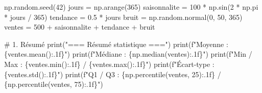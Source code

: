 \documentclass[
  french,
  11pt,
  a4paper,
]{scrbook}
\newenvironment{Shaded}{}{}
\newcommand{\BuiltInTok}[1]{\textcolor[rgb]{0.84,0.23,0.29}{#1}}
\newcommand{\CommentTok}[1]{\textcolor[rgb]{0.42,0.45,0.49}{#1}}
\newcommand{\DecValTok}[1]{\textcolor[rgb]{0.00,0.36,0.77}{#1}}
\newcommand{\FloatTok}[1]{\textcolor[rgb]{0.00,0.36,0.77}{#1}}
\newcommand{\NormalTok}[1]{\textcolor[rgb]{0.14,0.16,0.18}{#1}}
\newcommand{\OperatorTok}[1]{\textcolor[rgb]{0.14,0.16,0.18}{#1}}
\newcommand{\SpecialCharTok}[1]{\textcolor[rgb]{0.00,0.36,0.77}{#1}}
\newcommand{\SpecialStringTok}[1]{\textcolor[rgb]{0.01,0.18,0.38}{#1}}
\newcommand{\StringTok}[1]{\textcolor[rgb]{0.01,0.18,0.38}{#1}}
\begin{document}
\begin{tcolorbox}[enhanced jigsaw, arc=.35mm, bottomrule=.15mm, bottomtitle=1mm, breakable, colback=white, colbacktitle=quarto-callout-tip-color!10!white, colframe=quarto-callout-tip-color-frame, coltitle=black, left=2mm, leftrule=.75mm, opacityback=0, opacitybacktitle=0.6, rightrule=.15mm, title=\textcolor{quarto-callout-tip-color}{\faLightbulb}\hspace{0.5em}{✅ Voir la correction}, titlerule=0mm, toprule=.15mm, toptitle=1mm]

\begin{Shaded}
\begin{Highlighting}[]
\NormalTok{np.random.seed(}\DecValTok{42}\NormalTok{)}
\NormalTok{jours }\OperatorTok{=}\NormalTok{ np.arange(}\DecValTok{365}\NormalTok{)}
\NormalTok{saisonnalite }\OperatorTok{=} \DecValTok{100} \OperatorTok{*}\NormalTok{ np.sin(}\DecValTok{2} \OperatorTok{*}\NormalTok{ np.pi }\OperatorTok{*}\NormalTok{ jours }\OperatorTok{/} \DecValTok{365}\NormalTok{)}
\NormalTok{tendance }\OperatorTok{=} \FloatTok{0.5} \OperatorTok{*}\NormalTok{ jours}
\NormalTok{bruit }\OperatorTok{=}\NormalTok{ np.random.normal(}\DecValTok{0}\NormalTok{, }\DecValTok{50}\NormalTok{, }\DecValTok{365}\NormalTok{)}
\NormalTok{ventes }\OperatorTok{=} \DecValTok{500} \OperatorTok{+}\NormalTok{ saisonnalite }\OperatorTok{+}\NormalTok{ tendance }\OperatorTok{+}\NormalTok{ bruit}

\CommentTok{\# 1. Résumé}
\BuiltInTok{print}\NormalTok{(}\StringTok{"=== Résumé statistique ==="}\NormalTok{)}
\BuiltInTok{print}\NormalTok{(}\SpecialStringTok{f"Moyenne    : }\SpecialCharTok{\{}\NormalTok{ventes}\SpecialCharTok{.}\NormalTok{mean()}\SpecialCharTok{:.1f\}}\SpecialStringTok{"}\NormalTok{)}
\BuiltInTok{print}\NormalTok{(}\SpecialStringTok{f"Médiane    : }\SpecialCharTok{\{}\NormalTok{np}\SpecialCharTok{.}\NormalTok{median(ventes)}\SpecialCharTok{:.1f\}}\SpecialStringTok{"}\NormalTok{)}
\BuiltInTok{print}\NormalTok{(}\SpecialStringTok{f"Min / Max  : }\SpecialCharTok{\{}\NormalTok{ventes}\SpecialCharTok{.}\BuiltInTok{min}\NormalTok{()}\SpecialCharTok{:.1f\}}\SpecialStringTok{ / }\SpecialCharTok{\{}\NormalTok{ventes}\SpecialCharTok{.}\BuiltInTok{max}\NormalTok{()}\SpecialCharTok{:.1f\}}\SpecialStringTok{"}\NormalTok{)}
\BuiltInTok{print}\NormalTok{(}\SpecialStringTok{f"Écart{-}type : }\SpecialCharTok{\{}\NormalTok{ventes}\SpecialCharTok{.}\NormalTok{std()}\SpecialCharTok{:.1f\}}\SpecialStringTok{"}\NormalTok{)}
\BuiltInTok{print}\NormalTok{(}\SpecialStringTok{f"Q1 / Q3    : }\SpecialCharTok{\{}\NormalTok{np}\SpecialCharTok{.}\NormalTok{percentile(ventes, }\DecValTok{25}\NormalTok{)}\SpecialCharTok{:.1f\}}\SpecialStringTok{ / }\SpecialCharTok{\{}\NormalTok{np}\SpecialCharTok{.}\NormalTok{percentile(ventes, }\DecValTok{75}\NormalTok{)}\SpecialCharTok{:.1f\}}\SpecialStringTok{"}\NormalTok{)}


\end{Highlighting}
\end{Shaded}
\end{tcolorbox}
\end{document}
